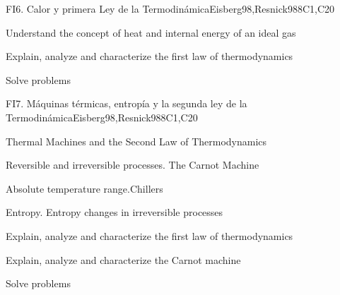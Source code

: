 \begin{syllabus}
\begin{unit}{FI6. Calor y primera Ley de la Termodinámica}{}{Eisberg98,Resnick98}{8}{C1,C20}
   \begin{learningoutcomes}
         \item  Understand the concept of heat and internal energy of an ideal gas
         \item  Explain, analyze and characterize the first law of thermodynamics
         \item  Solve problems
   \end{learningoutcomes}
\end{unit}

\begin{unit}{FI7. Máquinas térmicas, entropía y la segunda ley de la Termodinámica}{}{Eisberg98,Resnick98}{8}{C1,C20}
\begin{topics}
         \item  Thermal Machines and the Second Law of Thermodynamics
	 \item  Reversible and irreversible processes. The Carnot Machine
         \item  Absolute temperature range.Chillers 
	 \item  Entropy. Entropy changes in irreversible processes
   \end{topics}

   \begin{learningoutcomes}
         \item  Explain, analyze and characterize the first law of thermodynamics
         \item  Explain, analyze and characterize the Carnot machine
         \item  Solve problems
   \end{learningoutcomes}
\end{unit}

\begin{coursebibliography}
\end{coursebibliography}

\end{syllabus}

%
